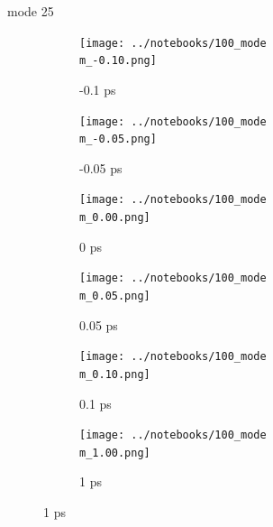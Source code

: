 \documentclass{beamer}
\newcommand\w{0.32}
\begin{document}
\renewcommand\m{25}
\begin{frame}{mode \m}
	\begin{figure}
		\centering
		\begin{subfigure}[b]{\w\textwidth}
			\centering
			\texttt{[image: ../notebooks/100\_mode\\m\_-0.10.png]}
			\caption{-0.1 ps}
		\end{subfigure}
		\begin{subfigure}[b]{\w\textwidth}
			\centering
			\texttt{[image: ../notebooks/100\_mode\\m\_-0.05.png]}
			\caption{-0.05 ps}
		\end{subfigure}
		\begin{subfigure}[b]{\w\textwidth}
			\centering
			\texttt{[image: ../notebooks/100\_mode\\m\_0.00.png]}
			\caption{0 ps}
		\end{subfigure}
		\begin{subfigure}[b]{\w\textwidth}
			\centering
			\texttt{[image: ../notebooks/100\_mode\\m\_0.05.png]}
			\caption{0.05 ps}
		\end{subfigure}
		\begin{subfigure}[b]{\w\textwidth}
			\centering
			\texttt{[image: ../notebooks/100\_mode\\m\_0.10.png]}
			\caption{0.1 ps}
		\end{subfigure}
		\begin{subfigure}[b]{\w\textwidth}
			\centering
			\texttt{[image: ../notebooks/100\_mode\\m\_1.00.png]}
			\caption{1 ps}
		\end{subfigure}
	\end{figure}
\end{frame}
\end{document}
